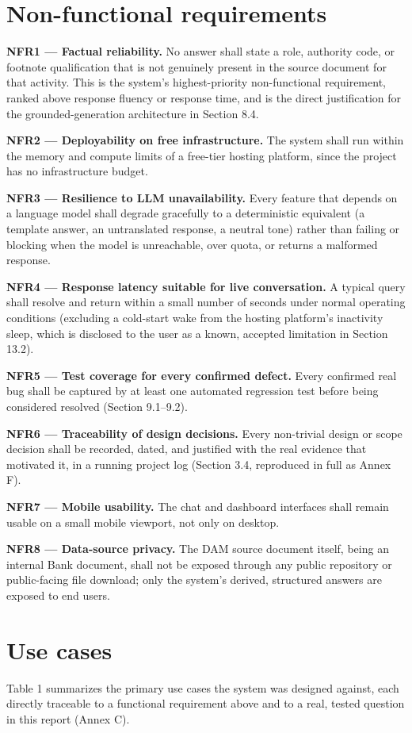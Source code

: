 \section{Non-functional requirements}
\textbf{NFR1 — Factual reliability.} No answer shall state a role, authority code, or footnote qualification that is not genuinely present in the source document for that activity. This is the system's highest-priority non-functional requirement, ranked above response fluency or response time, and is the direct justification for the grounded-generation architecture in Section 8.4.

\textbf{NFR2 — Deployability on free infrastructure.} The system shall run within the memory and compute limits of a free-tier hosting platform, since the project has no infrastructure budget.

\textbf{NFR3 — Resilience to LLM unavailability.} Every feature that depends on a language model shall degrade gracefully to a deterministic equivalent (a template answer, an untranslated response, a neutral tone) rather than failing or blocking when the model is unreachable, over quota, or returns a malformed response.

\textbf{NFR4 — Response latency suitable for live conversation.} A typical query shall resolve and return within a small number of seconds under normal operating conditions (excluding a cold-start wake from the hosting platform's inactivity sleep, which is disclosed to the user as a known, accepted limitation in Section 13.2).

\textbf{NFR5 — Test coverage for every confirmed defect.} Every confirmed real bug shall be captured by at least one automated regression test before being considered resolved (Section 9.1–9.2).

\textbf{NFR6 — Traceability of design decisions.} Every non-trivial design or scope decision shall be recorded, dated, and justified with the real evidence that motivated it, in a running project log (Section 3.4, reproduced in full as Annex F).

\textbf{NFR7 — Mobile usability.} The chat and dashboard interfaces shall remain usable on a small mobile viewport, not only on desktop.

\textbf{NFR8 — Data-source privacy.} The DAM source document itself, being an internal Bank document, shall not be exposed through any public repository or public-facing file download; only the system's derived, structured answers are exposed to end users.

\section{Use cases}
Table 1 summarizes the primary use cases the system was designed against, each directly traceable to a functional requirement above and to a real, tested question in this report (Annex C).

